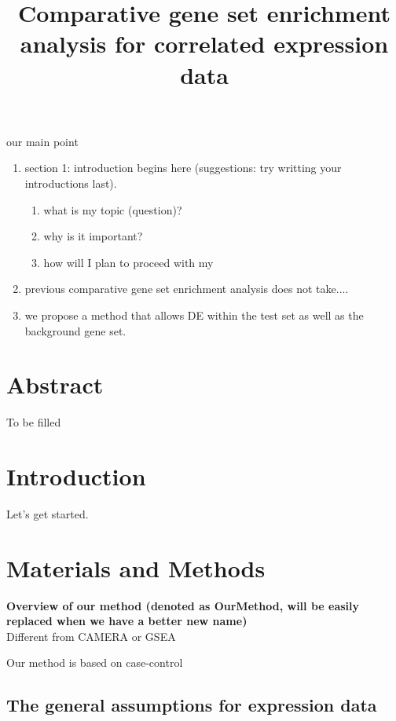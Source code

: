 \documentclass[11pt, a4paper]{article}
\title{Comparative gene set enrichment analysis for correlated expression data}
\date{} %
\begin{document}
	our main point
	\begin{enumerate}
		\item section 1:  introduction begins here (suggestions: try writting your introductions last).
		 \begin{enumerate}
		 	\item what is my topic (question)?
		 	\item why is it important?
		 	\item how will I plan to proceed with my
		 \end{enumerate}
		\item previous comparative gene set enrichment analysis does not take....
		\item we propose a method that allows DE within the test set as well as the background gene set.
	\end{enumerate}
	
	
	\newpage
	\maketitle
	
	\section*{Abstract}
	To be filled
	
	\section{Introduction}\label{section:introduction}
	Let's get started.
	
	
	
	\section{Materials and Methods}\label{section:methods}
	\textbf{Overview of our method (denoted as OurMethod, will be easily replaced when we have a better new name)} \\
	Different from CAMERA\cite{wu2012camera} or GSEA \citep{subramanian2005gene}
	
	Our method is based on case-control
	
	\subsection{The general assumptions for expression data}\label{subsection:assumption}
\end{document}
